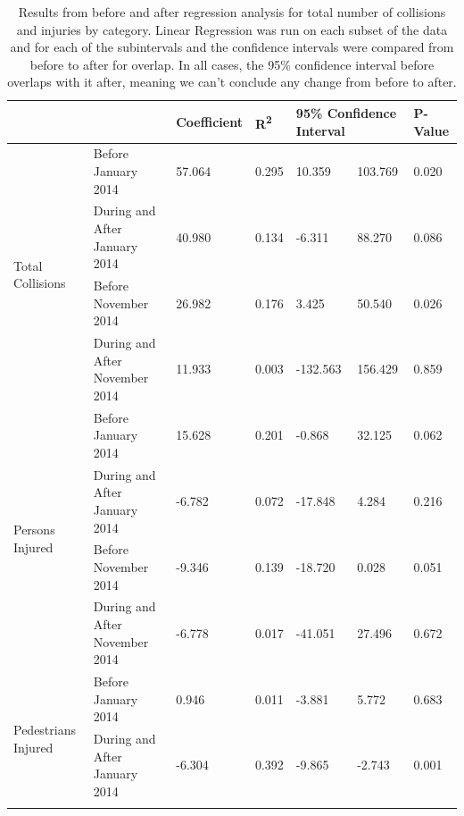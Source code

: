 \documentclass[10pt,journal,compsoc]{IEEEtran}
\begin{document}
\begin{table}[]
\centering
\caption{Results from before and after regression analysis for total number of collisions and injuries by category. Linear Regression was run on each subset of the data and for each of the subintervals and the confidence intervals were compared from before to after for overlap.  In all cases, the 95\% confidence interval before overlaps with it after, meaning we can't conclude any change from before to after. }
\label{tab:ana}
\begin{tabular}{|l|l|l|l|l|l|l|}
\hline
                                     &            & Coefficient & R\textsuperscript{2}    & \multicolumn{2}{l|}{95\% Confidence Interval} & P-Value \\ \hline
\multirow{4}{*}{Total Collisions}    & Before January 2014 & 57.064      & 0.295 & 10.359                 & 103.769              & 0.020   \\ \cline{2-7} 
                                     & During and After January 2014  & 40.980      & 0.134 & -6.311                 & 88.270               & 0.086   \\ \cline{2-7} 
                                     & Before November 2014 & 26.982      & 0.176 & 3.425                  & 50.540                & 0.026  \\ \cline{2-7} 
                                     & During and After November 2014  & 11.933      & 0.003 & -132.563               & 156.429              & 0.859   \\ \hline
\multirow{4}{*}{Persons Injured}     & Before January 2014 & 15.628      & 0.201 & -0.868                 & 32.125               & 0.062   \\ \cline{2-7} 
                                     & During and After January 2014  & -6.782      & 0.072 & -17.848                & 4.284                & 0.216   \\ \cline{2-7} 
                                     & Before November 2014 & -9.346      & 0.139 & -18.720                & 0.028                & 0.051   \\ \cline{2-7} 
                                     & During and After November 2014  & -6.778      & 0.017 & -41.051                & 27.496               & 0.672   \\ \hline
\multirow{4}{*}{Pedestrians Injured} & Before January 2014 & 0.946       & 0.011 & -3.881                 & 5.772                & 0.683   \\ \cline{2-7} 
                                     & During and After January 2014  & -6.304      & 0.392 & -9.865                 & -2.743               & 0.001   \\ \cline{2-7} 

\end{tabular}
\end{table}
\end{document}
